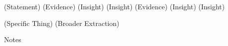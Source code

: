 \documentclass[12pt]{article}
\begin{document}
\begin{flushleft}
(Statement)
(Evidence)
(Insight)
(Insight)
(Evidence)
(Insight)
(Insight)

(Specific Thing)
(Broader Extraction)
\begin{center}
Notes
\end{center}


\setlength{\parindent}{0.5in}

\end{flushleft}
\end{document}
